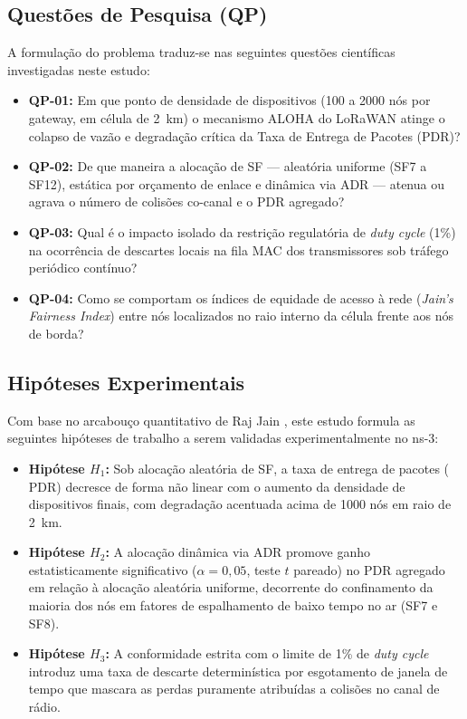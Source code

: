 \documentclass[12pt]{article}
\begin{document}
\subsection{Questões de Pesquisa (QP)}
A formulação do problema traduz-se nas seguintes questões científicas investigadas neste estudo:
\begin{itemize}
    \item \textbf{QP-01:} Em que ponto de densidade de dispositivos (100 a 2000 nós por gateway, em célula de 2~km) o mecanismo ALOHA do LoRaWAN atinge o colapso de vazão e degradação crítica da Taxa de Entrega de Pacotes (PDR)?
    \item \textbf{QP-02:} De que maneira a alocação de SF --- aleatória uniforme (SF7 a SF12), estática por orçamento de enlace e dinâmica via ADR --- atenua ou agrava o número de colisões co-canal e o PDR agregado?
    \item \textbf{QP-03:} Qual é o impacto isolado da restrição regulatória de \textit{duty cycle} (1\%) na ocorrência de descartes locais na fila MAC dos transmissores sob tráfego periódico contínuo?
    \item \textbf{QP-04:} Como se comportam os índices de equidade de acesso à rede (\textit{Jain's Fairness Index}) entre nós localizados no raio interno da célula frente aos nós de borda?
\end{itemize}

\subsection{Hipóteses Experimentais}
Com base no arcabouço quantitativo de Raj Jain \cite{jain1991art}, este estudo formula as seguintes hipóteses de trabalho a serem validadas experimentalmente no ns-3:
\begin{itemize}
    \item \textbf{Hipótese $H_1$:} Sob alocação aleatória de SF, a taxa de entrega de pacotes ($\mathrm{PDR}$) decresce de forma não linear com o aumento da densidade de dispositivos finais, com degradação acentuada acima de 1000 nós em raio de 2~km.
    \item \textbf{Hipótese $H_2$:} A alocação dinâmica via ADR promove ganho estatisticamente significativo ($\alpha = 0{,}05$, teste $t$ pareado) no PDR agregado em relação à alocação aleatória uniforme, decorrente do confinamento da maioria dos nós em fatores de espalhamento de baixo tempo no ar (SF7 e SF8).
    \item \textbf{Hipótese $H_3$:} A conformidade estrita com o limite de 1\% de \textit{duty cycle} introduz uma taxa de descarte determinística por esgotamento de janela de tempo que mascara as perdas puramente atribuídas a colisões no canal de rádio.
\end{itemize}
\end{document}
